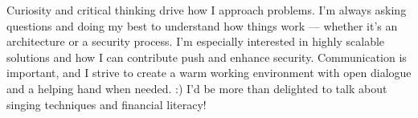 \vspace{-1.5em}
\vspace{0.5em}

Curiosity and critical thinking drive how I approach problems. I’m always asking questions and doing my best to understand how things work — whether it's an architecture or a security process. I’m especially interested in highly scalable solutions and how I can contribute push and enhance security.
Communication is important, and I strive to create a warm working environment with open dialogue and a helping hand when needed. :) I’d be more than delighted to talk about singing techniques and financial literacy! 